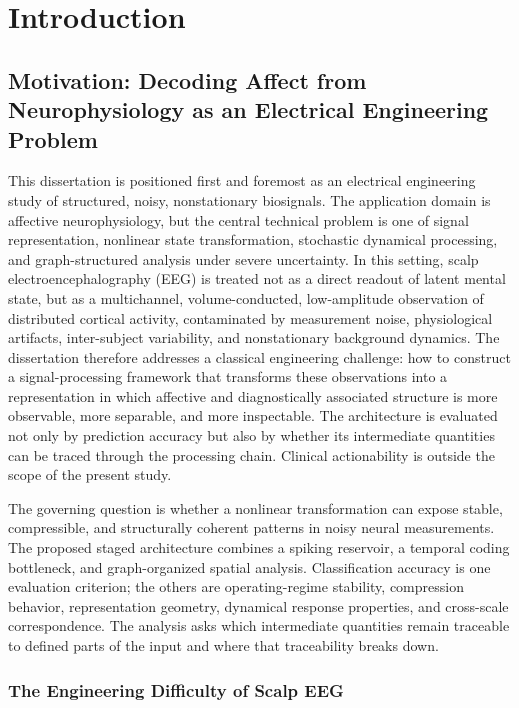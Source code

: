 \chapter{Introduction}
\label{chap:introduction}

\section{Motivation: Decoding Affect from Neurophysiology as an Electrical Engineering Problem}

This dissertation is positioned first and foremost as an electrical engineering study of structured, noisy, nonstationary biosignals. The application domain is affective neurophysiology, but the central technical problem is one of signal representation, nonlinear state transformation, stochastic dynamical processing, and graph-structured analysis under severe uncertainty. In this setting, scalp electroencephalography (EEG) is treated not as a direct readout of latent mental state, but as a multichannel, volume-conducted, low-amplitude observation of distributed cortical activity, contaminated by measurement noise, physiological artifacts, inter-subject variability, and nonstationary background dynamics. The dissertation therefore addresses a classical engineering challenge: how to construct a signal-processing framework that transforms these observations into a representation in which affective and diagnostically associated structure is more observable, more separable, and more inspectable. The architecture is evaluated not only by prediction accuracy but also by whether its intermediate quantities can be traced through the processing chain. Clinical actionability is outside the scope of the present study.

The governing question is whether a nonlinear transformation can expose stable, compressible, and structurally coherent patterns in noisy neural measurements. The proposed staged architecture combines a spiking reservoir, a temporal coding bottleneck, and graph-organized spatial analysis. Classification accuracy is one evaluation criterion; the others are operating-regime stability, compression behavior, representation geometry, dynamical response properties, and cross-scale correspondence. The analysis asks which intermediate quantities remain traceable to defined parts of the input and where that traceability breaks down.

\subsection{The Engineering Difficulty of Scalp EEG}

